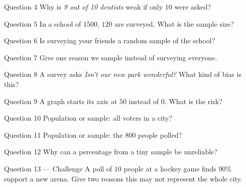 \documentclass[11pt]{article}
\begin{document}
\begin{qbox}{Question 4}
Why is \emph{9 out of 10 dentists} weak if only $10$ were asked?\workspace{2.4cm}
\end{qbox}

\begin{qbox}{Question 5}
In a school of $1500$, $120$ are surveyed. What is the sample size?\workspace{2.4cm}
\end{qbox}

\begin{qbox}{Question 6}
Is surveying your friends a random sample of the school?\workspace{2.4cm}
\end{qbox}

\begin{qbox}{Question 7}
Give one reason we sample instead of surveying everyone.\workspace{2.4cm}
\end{qbox}

\begin{qbox}{Question 8}
A survey asks \emph{Isn't our new park wonderful?} What kind of bias is this?\workspace{2.4cm}
\end{qbox}

\begin{qbox}{Question 9}
A graph starts its axis at $50$ instead of $0$. What is the risk?\workspace{2.4cm}
\end{qbox}

\begin{qbox}{Question 10}
Population or sample: all voters in a city?\workspace{2.4cm}
\end{qbox}

\begin{qbox}{Question 11}
Population or sample: the $800$ people polled?\workspace{2.4cm}
\end{qbox}

\begin{qbox}{Question 12}
Why can a percentage from a tiny sample be unreliable?\workspace{2.4cm}
\end{qbox}

\begin{qbox}{Question 13 --- Challenge}
A poll of $10$ people at a hockey game finds $90\%$ support a new arena. Give two reasons this may not represent the whole city.\workspace{3.2cm}
\end{qbox}

\clearpage
{}
\end{document}
